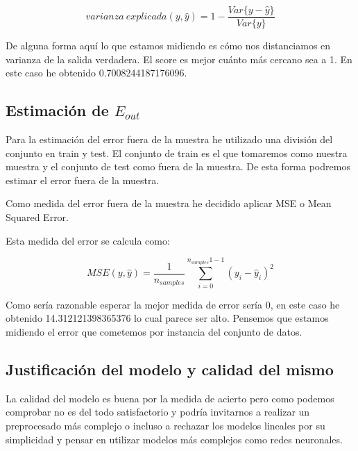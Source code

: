 \documentclass[12pt,a4paper]{article}
\begin{document}
$$varianza \ explicada(y,\hat{y}) = 1-\frac{Var\{y-\hat{y}\}}{Var\{y\}}$$

De alguna forma aquí lo que estamos midiendo es cómo nos distanciamos en varianza de la salida verdadera. El score es mejor cuánto más cercano sea a 1. En este caso he obtenido 0.7008244187176096.

\subsection{Estimación de $E_{out}$}

Para la estimación del error fuera de la muestra he utilizado una división del conjunto en train y test. El conjunto de train es el que tomaremos como nuestra muestra y el conjunto de test como fuera de la muestra. De esta forma podremos estimar el error fuera de la muestra.

Como medida del error fuera de la muestra he decidido aplicar MSE o Mean Squared Error. 

Esta medida del error se calcula como:

$$MSE(y,\hat{y}) = \frac{1}{n_{samples}}\sum_{i=0}^{n_{samples}1-1}(y_i - \hat{y}_i)^2$$

Como sería razonable esperar la mejor medida de error sería 0, en este caso he obtenido 14.312121398365376 lo cual parece ser alto. Pensemos que estamos midiendo el error que cometemos por instancia del conjunto de datos.

\subsection{Justificación del modelo y calidad del mismo}

La calidad del modelo es buena por la medida de acierto pero como podemos comprobar no es del todo satisfactorio y podría invitarnos a realizar un preprocesado más complejo o incluso a rechazar los modelos lineales por su simplicidad y pensar en utilizar modelos más complejos como redes neuronales.
\end{document}
